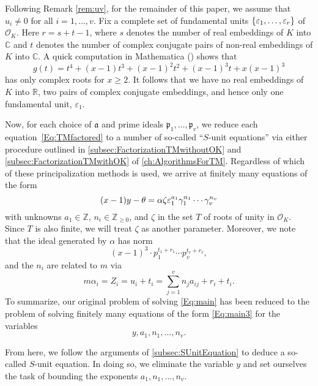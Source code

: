 Following Remark \ref{rem:uv}, for the remainder of this paper, we assume that $u_i \neq 0$ for all $i = 1, \dots, v$. Fix a complete set of fundamental units $\{\varepsilon_1, \dots, \varepsilon_r\}$ of $\mathcal{O}_K$. Here $r = s + t -1$, where $s$ denotes the number of real embeddings of $K$ into $\mathbb{C}$ and $t$ denotes the number of complex conjugate pairs of non-real embeddings of $K$ into $\mathbb{C}$. A quick computation in Mathematica () shows that  
\[g(t) = t^4 + (x-1)t^3 + (x-1)^2t^2 + (x-1)^3t + x(x-1)^3\]
has only complex roots for $x \geq 2$. It follows that we have no real embeddings of $K$ into $\mathbb{R}$, two pairs of complex conjugate embeddings, and hence only one fundamental unit, $\varepsilon_1$. 

Now, for each choice of $\mathfrak{a}$ and prime ideals $\mathfrak{p}_1, \dots, \mathfrak{p}_v$, we reduce each equation~\eqref{Eq:TMfactored} to a number of so-called ``$S$-unit equations'' via either procedure outlined in \autoref{subsec:FactorizationTMwithoutOK} and \autoref{subsec:FactorizationTMwithOK} of \autoref{ch:AlgorithmsForTM}. Regardless of which of these principalization methods is used, we arrive at finitely many equations of the form
\begin{equation} \label{Eq:main2}
(x-1)y - \theta = \alpha \zeta \varepsilon_1^{a_1}\gamma_1^{n_1}\cdots \gamma_v^{n_v}
\end{equation}
with unknowns $a_1 \in \mathbb{Z}$, $n_i \in \mathbb{Z}_{\geq 0}$, and $\zeta$ in the set $T$ of roots of unity in $\mathcal{O}_K$. Since $T$ is also finite, we will treat $\zeta$ as another parameter. Moreover, we note that the ideal generated by $\alpha$ has norm
\begin{equation} \label{Eq:main3}
(x-1)^3\cdot p_1^{t_1 + r_1} \cdots p_v^{t_v + r_v},
\end{equation}
and the $n_i$ are related to $m$ via
\[m \alpha_i = Z_i = u_i + t_i = \sum_{j = 1}^{v}n_ja_{ij} + r_i + t_i.\]
To summarize, our original problem of solving \eqref{Eq:main} has been reduced to the problem of solving finitely many equations of the form \eqref{Eq:main3} for the variables 
\[y, a_1, n_1, \dots, n_v.\] 

From here, we follow the arguments of \autoref{subsec:SUnitEquation} to deduce a so-called $S$-unit equation. In doing so, we eliminate the variable $y$ and set ourselves the task of bounding the exponents $a_1, n_1, \dots, n_v$. 

